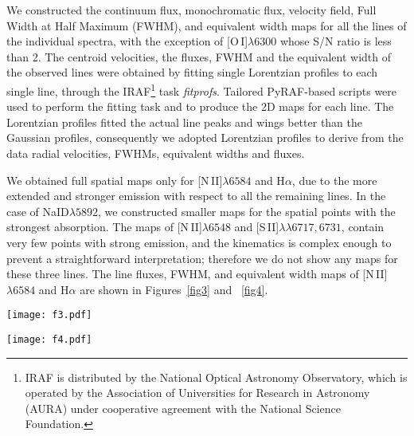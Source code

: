 \documentclass[fleqn,usenatbib]{mnras}
\begin{document}
We constructed the continuum flux, monochromatic flux, velocity field, Full Width at Half Maximum (FWHM), and equivalent width maps for all the lines of the individual spectra, 
with the exception of \hbox{[O\,I]$\lambda6300$} whose S/N ratio is less than 2. The centroid velocities, the fluxes, FWHM and the equivalent width of the observed lines were 
obtained by fitting single Lorentzian profiles to each single line, through the IRAF\footnote{IRAF is distributed by the National Optical Astronomy Observatory, 
which is operated by the Association of Universities for Research in Astronomy (AURA) under cooperative agreement with the National Science Foundation.} task {\it fitprofs}. Tailored 
PyRAF-based scripts were used to perform the fitting task and to produce the 2D maps for each line. The Lorentzian profiles fitted the actual line peaks and wings 
better than the Gaussian profiles, consequently we adopted Lorentzian profiles to derive from the data radial velocities, FWHMs, equivalent widths and fluxes.

We obtained full spatial maps only for \hbox{[N\,II]$\lambda6584$} and H$\alpha$, due to the more extended and stronger emission with respect to all the remaining lines. 
In the case of NaID$\lambda5892$, we constructed smaller maps for the spatial points with the strongest absorption. The maps of \hbox{[N\,II]$\lambda6548$}  and 
\hbox{[S\,II]$\lambda\lambda6717,6731$}, contain very few points with strong emission, and the kinematics is complex enough to prevent a straightforward interpretation; 
therefore we do not show any maps for these three lines. The line fluxes, FWHM, and equivalent width maps of \hbox{[N\,II]$\lambda6584$} and H$\alpha$ are shown in 
Figures~\ref{fig3} and ~\ref{fig4}.

\begin{figure*}
\texttt{[image: f3.pdf]}
\caption{Left panel: logarithm of the observed monochromatic flux of \hbox{[N\,II]$\lambda6584$}. 
Middle panel: Lorentzian FWHM of \hbox{[N\,II]$\lambda6584$}. Right panel: equivalent 
width of \hbox{[N\,II]$\lambda6584$}.}
\label{fig3} 
\end{figure*}

\begin{figure*}
\texttt{[image: f4.pdf]}
\caption{Left panel: logarithm of the observed monochromatic flux of H$\alpha$. 
Middle panel: Lorentzian FWHM of H$\alpha$.  Right panel: equivalent 
width of H$\alpha$.}
\label{fig4} 
\end{figure*}
\end{document}
